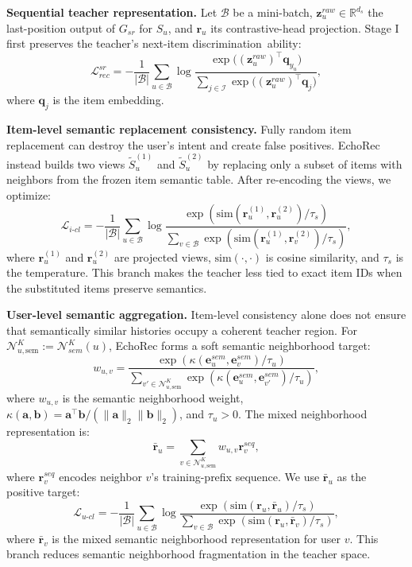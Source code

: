 ﻿\documentclass{article}
\begin{document}
\noindent\textbf{Sequential teacher representation.} Let $\mathcal B$ be a mini-batch, $\mathbf{z}_u^{raw}\in\mathbb{R}^{d_s}$ the last-position output of $G_{sr}$ for $S_u$, and $\mathbf{r}_u$ its contrastive-head projection. Stage I first preserves the teacher's next-item discrimination~ability:
\begin{equation}
\mathcal{L}_{rec}^{sr}
=-\frac{1}{|\mathcal{B}|}\sum_{u\in\mathcal{B}}
\log
\frac{\exp\big((\mathbf{z}_u^{raw})^\top \mathbf{q}_{y_u}\big)}
{\sum_{j\in\mathcal I}\exp\big((\mathbf{z}_u^{raw})^\top \mathbf{q}_{j}\big)},
\end{equation}
where $\mathbf{q}_j$ is the item embedding.

\noindent\textbf{Item-level semantic replacement consistency.} Fully random item replacement can destroy the user's intent and create false positives. EchoRec instead builds two views $\tilde{S}_u^{(1)}$ and $\tilde{S}_u^{(2)}$ by replacing only a subset of items with neighbors from the frozen item semantic table. After re-encoding the views, we optimize:
\begin{equation}
\mathcal{L}_{i\text{-}cl}
=-\frac{1}{|\mathcal{B}|}\sum_{u\in\mathcal{B}}
\log
\frac{\exp(\mathrm{sim}(\mathbf{r}_u^{(1)},\mathbf{r}_u^{(2)})/\tau_s)}
{\sum_{v\in\mathcal{B}}
\exp(\mathrm{sim}(\mathbf{r}_u^{(1)},\mathbf{r}_v^{(2)})/\tau_s)},
\end{equation}
where $\mathbf{r}_u^{(1)}$ and $\mathbf{r}_u^{(2)}$ are projected views, $\mathrm{sim}(\cdot,\cdot)$ is cosine similarity, and $\tau_s$ is the temperature. This branch makes the teacher less tied to exact item IDs when the substituted items preserve semantics.

\noindent\textbf{User-level semantic aggregation.} Item-level consistency alone does not ensure that semantically similar histories occupy a coherent teacher region. For $\mathcal{N}_{u,\mathrm{sem}}^K:=\mathcal{N}_{sem}^{K}(u)$, EchoRec forms a soft semantic neighborhood target:
\begin{equation}
w_{u,v}
=
\frac{\exp(\kappa(\mathbf{e}_u^{sem},\mathbf{e}_v^{sem})/\tau_u)}
{\sum_{v'\in\mathcal{N}_{u,\mathrm{sem}}^K}\exp(\kappa(\mathbf{e}_u^{sem},\mathbf{e}_{v'}^{sem})/\tau_u)},
\end{equation}
where $w_{u,v}$ is the semantic neighborhood weight, $\kappa(\mathbf a,\mathbf b)=\mathbf a^\top\mathbf b/(\|\mathbf a\|_2\|\mathbf b\|_2)$, and $\tau_u>0$. The mixed neighborhood representation is:
\begin{equation}
\bar{\mathbf{r}}_u=\sum_{v\in\mathcal{N}_{u,\mathrm{sem}}^K}w_{u,v}\mathbf{r}_{v}^{seq},
\end{equation}
where $\mathbf{r}_{v}^{seq}$ encodes neighbor $v$'s training-prefix sequence. We use $\bar{\mathbf{r}}_u$ as the positive target:
\begin{equation}
\mathcal{L}_{u\text{-}cl}
=-\frac{1}{|\mathcal{B}|}\sum_{u\in\mathcal{B}}
\log
\frac{\exp(\mathrm{sim}(\mathbf{r}_u,\bar{\mathbf{r}}_u)/\tau_s)}
{\sum_{v\in\mathcal{B}}
\exp(\mathrm{sim}(\mathbf{r}_u,\bar{\mathbf{r}}_v)/\tau_s)},
\end{equation}
where $\bar{\mathbf{r}}_v$ is the mixed semantic neighborhood representation for user $v$. This branch reduces semantic neighborhood fragmentation in the teacher space.
\end{document}
